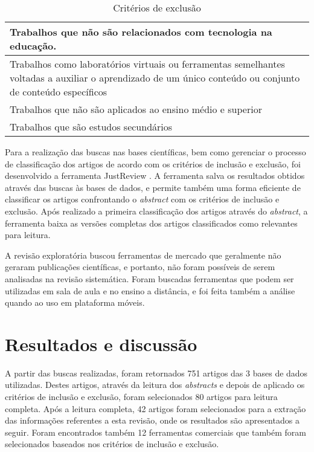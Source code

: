 \bgroup
\def\arraystretch{1.5} %
\begin{table}[h]{} %
\centering
\begin{tabular}{ | p{14cm}| } \hline
Trabalhos que não são relacionados com tecnologia na educação. \\ \hline
Trabalhos como laboratórios virtuais ou ferramentas semelhantes voltadas a auxiliar o aprendizado de um único conteúdo ou conjunto de conteúdo específicos \\ \hline
Trabalhos que não são aplicados ao ensino médio e superior \\ \hline
Trabalhos que são estudos secundários \\ \hline
\end{tabular}
\caption{Critérios de exclusão}
\label{tab:criteriosExclusao}
\end{table}
\egroup

Para a realização das buscas nas bases científicas, bem como gerenciar o processo de classificação dos artigos de acordo com os critérios de inclusão e exclusão, foi desenvolvido a ferramenta JustReview \cite{justreview_artigo}. A ferramenta salva os resultados obtidos através das buscas às bases de dados, e permite também uma forma eficiente de classificar os artigos confrontando o \emph{abstract} com os critérios de inclusão e exclusão. Após realizado a primeira classificação dos artigos através do \emph{abstract}, a ferramenta baixa as versões completas dos artigos classificados como relevantes para leitura.

A revisão exploratória buscou ferramentas de mercado que geralmente não geraram publicações científicas, e portanto, não foram possíveis de serem analisadas na revisão sistemática. Foram buscadas ferramentas que podem ser utilizadas em sala de aula e no ensino a distância, e foi feita também a análise quando ao uso em plataforma móveis.

\section{Resultados e discussão}
A partir das buscas realizadas, foram retornados 751 artigos das 3 bases de dados utilizadas. Destes artigos, através da leitura dos \emph{abstracts} e depois de aplicado os critérios de inclusão e exclusão, foram selecionados 80 artigos para leitura completa. Após a leitura completa, 42 artigos foram selecionados para a extração das informações referentes a esta revisão, onde os resultados são apresentados a seguir. Foram encontrados também 12 ferramentas comerciais que também foram selecionados baseados nos critérios de inclusão e exclusão.

